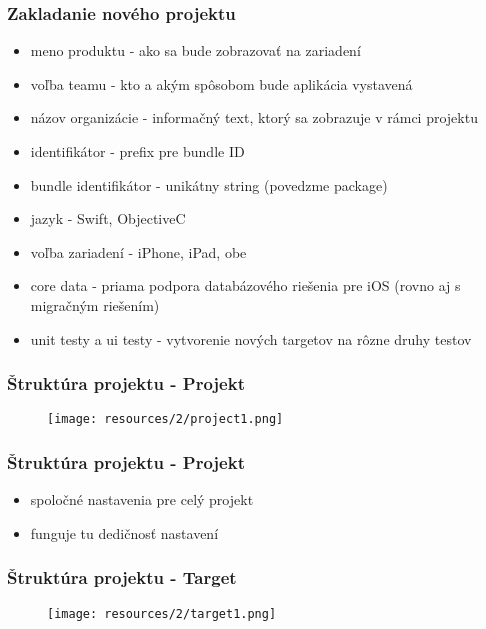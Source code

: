 \documentclass[serif,mathserif]{beamer}
\begin{document}
\begin{frame}
  \frametitle{Zakladanie nového projektu}
  \begin{itemize}
  \item meno produktu - ako sa bude zobrazovať na zariadení\pause
  \item voľba teamu - kto a akým spôsobom bude aplikácia vystavená\pause
  \item názov organizácie - informačný text, ktorý sa zobrazuje v rámci projektu\pause
  \item identifikátor - prefix pre bundle ID \pause
  \item bundle identifikátor - unikátny string (povedzme package)\pause
  \item jazyk - Swift, ObjectiveC\pause
  \item voľba zariadení - iPhone, iPad, obe\pause
  \item core data - priama podpora databázového riešenia pre iOS (rovno aj s migračným riešením)\pause
    \item unit testy a ui testy - vytvorenie nových targetov na rôzne druhy testov
  \end{itemize}
\end{frame}

\begin{frame}
  \frametitle{Štruktúra projektu - Projekt}
 \begin{figure}[h]
	\texttt{[image: resources/2/project1.png]}
  \end{figure}
\end{frame}

\begin{frame}
  \frametitle{Štruktúra projektu - Projekt}
  \begin{itemize}
  \item spoločné nastavenia pre celý projekt\pause
  \item funguje tu dedičnosť nastavení
  \end{itemize}
\end{frame}

\begin{frame}
  \frametitle{Štruktúra projektu - Target}
 \begin{figure}[h]
	\texttt{[image: resources/2/target1.png]}
  \end{figure}
\end{frame}
\end{document}
